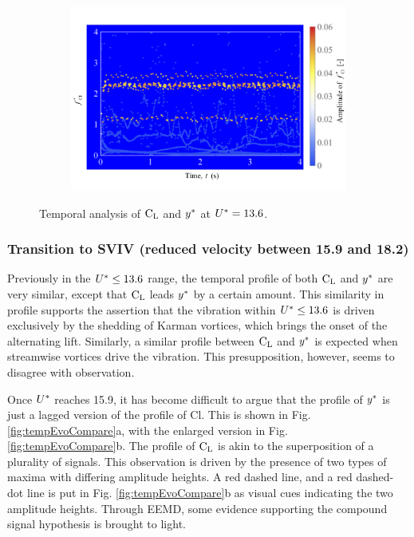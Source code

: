 \documentclass[oneside]{utmthesis}
\begin{document}
\begin{figure} \continuedfloat
  \centering
  \begin{subfigure}[h]{1\textwidth}
    \includegraphics[width=\textwidth]{figs/tempAnalysisLower-c}
    \caption{}
    \label{fig:tempAnalysisLower-c}
  \end{subfigure}
  \caption{Temporal analysis of $\text{C}_{\text{L}}$ and $y^{*}$ at $U^{*} = 13.6$.} \label{fig:tempAnalysisLower}
\end{figure}

\subsubsection{Transition to SVIV (reduced velocity between 15.9 and 18.2)} \label{sssec:transSVIV}
Previously in the $U^{*} \leq 13.6$ range, the temporal profile of both $\text{C}_{\text{L}}$ and  $y^{*}$ are very similar, except that $\text{C}_{\text{L}}$ leads $y^{*}$ by a certain amount. This similarity in profile supports the assertion that the vibration within $U^{*} \leq 13.6$ is driven exclusively by the shedding of Karman vortices, which brings the onset of the alternating lift. Similarly, a similar profile between $\text{C}_{\text{L}}$ and $y^{*}$ is expected when streamwise vortices drive the vibration. This presupposition, however, seems to disagree with observation.

Once $U^{*}$ reaches 15.9, it has become difficult to argue that the profile of $y^{*}$ is just a lagged version of the profile of Cl. This is shown in Fig. \ref{fig:tempEvoCompare}a, with the enlarged version in Fig. \ref{fig:tempEvoCompare}b. The profile of $\text{C}_{\text{L}}$ is akin to the superposition of a plurality of signals. This observation is driven by the presence of two types of maxima with differing amplitude heights. A red dashed line, and a red dashed-dot line is put in Fig. \ref{fig:tempEvoCompare}b as visual cues indicating the two amplitude heights. Through EEMD, some evidence supporting the compound signal hypothesis is brought to light.
\end{document}
